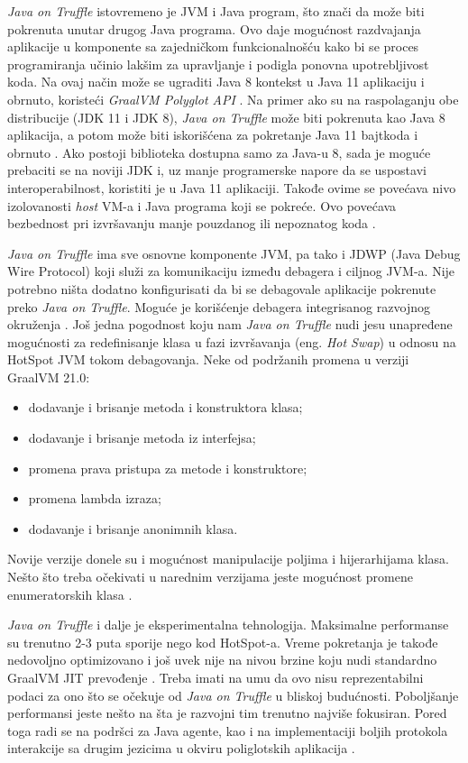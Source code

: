 \documentclass[a4paper]{article}
\begin{document}
\emph{Java on Truffle} istovremeno je JVM i Java program, što znači da može biti pokrenuta unutar drugog Java programa. Ovo daje mogućnost razdvajanja aplikacije u komponente sa zajedničkom funkcionalnošću kako bi se proces programiranja učinio lakšim za upravljanje i podigla ponovna upotrebljivost koda. Na ovaj način može se ugraditi Java 8 kontekst u Java 11 aplikaciju i obrnuto, koristeći \emph{GraalVM Polyglot API} \cite{graalvm}. Na primer ako su na raspolaganju obe distribucije (JDK 11 i JDK 8),
\emph{Java on Truffle} može biti pokrenuta kao Java 8 aplikacija, a potom može biti iskorišćena za pokretanje Java 11 bajtkoda i obrnuto \cite{grooteman2017java}. Ako postoji biblioteka dostupna samo za Java-u 8, sada je moguće prebaciti se na noviji JDK i, uz manje programerske napore da se uspostavi interoperabilnost, koristiti je u Java 11 aplikaciji. Takođe ovime se povećava nivo izolovanosti \emph{host} VM-a i Java programa koji se pokreće. Ovo povećava bezbednost pri izvršavanju manje pouzdanog ili nepoznatog koda \cite{graalvm}.

\emph{Java on Truffle} ima sve osnovne komponente JVM, pa tako i JDWP (Java Debug Wire Protocol) koji služi za komunikaciju između debagera i ciljnog JVM-a. Nije potrebno ništa dodatno konfigurisati da bi se debagovale aplikacije pokrenute preko \emph{Java on Truffle}. Moguće je korišćenje debagera integrisanog razvojnog okruženja \cite{graalvm}. Još jedna pogodnost koju nam \emph{Java on Truffle} nudi jesu unapređene mogućnosti za redefinisanje klasa u fazi izvršavanja (eng. \emph{Hot Swap}) u odnosu na HotSpot JVM tokom debagovanja. Neke od podržanih promena u verziji GraalVM 21.0:
\begin{itemize}
    \item dodavanje i brisanje metoda i konstruktora klasa;
    \item dodavanje i brisanje metoda iz interfejsa;
    \item promena prava pristupa za metode i konstruktore;
    \item promena lambda izraza;
    \item dodavanje i brisanje anonimnih klasa.
\end{itemize}
Novije verzije donele su i mogućnost manipulacije poljima i hijerarhijama klasa. Nešto što treba očekivati u narednim verzijama jeste mogućnost promene enumeratorskih klasa \cite{graalvm}.

\emph{Java on Truffle} i dalje je eksperimentalna tehnologija. Maksimalne performanse su trenutno 2-3 puta sporije nego kod HotSpot-a. Vreme pokretanja je takođe nedovoljno optimizovano i još uvek nije na nivou brzine koju nudi standardno GraalVM JIT prevođenje \cite{graalvm}. Treba imati na umu da ovo nisu reprezentabilni podaci za ono što se očekuje od \emph{Java on Truffle} u bliskoj budućnosti. Poboljšanje performansi jeste nešto na šta je razvojni tim trenutno najviše fokusiran. Pored toga radi se na podršci za Java agente, kao i na implementaciji boljih protokola interakcije sa drugim jezicima u okviru poliglotskih aplikacija \cite{graalvm}.
\end{document}

